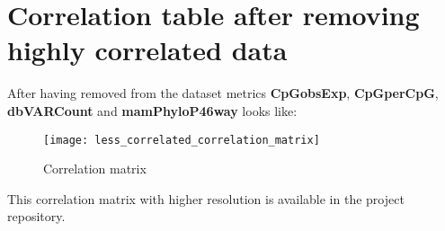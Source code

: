 \documentclass[\main/main.tex]{subfiles}
\begin{document}
\section{Correlation table after removing highly correlated data}
After having removed from the dataset metrics \textbf{CpGobsExp}, \textbf{CpGperCpG}, \textbf{dbVARCount} and \textbf{mamPhyloP46way} looks like:

\begin{figure}
  \texttt{[image: less\_correlated\_correlation\_matrix]}
  \caption{Correlation matrix}
\end{figure}

This correlation matrix with higher resolution is available in the project repository.
\end{document}
